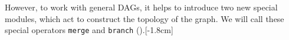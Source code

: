 However, to work with general DAGs, it helps to introduce two new special modules, which act to construct the topology of the graph. We will call these special operators \texttt{merge} and \texttt{branch} (\fig{\ref{fig:backpropagation:branch_and_merge}}).[-1.8cm] %

